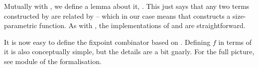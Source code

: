 Mutually with , we define a lemma about it,
. This just says that any two terms constructed by
 are related by  -- which in our case means that
 constructs a size-parametric function. As with
, the implementations of  and
 are straightforward.

It is now easy to define the fixpoint combinator  based on
. Defining $f$ in terms of it is also conceptually simple, but
the details are a bit gnarly. For the full picture, see module
 of the formalisation.